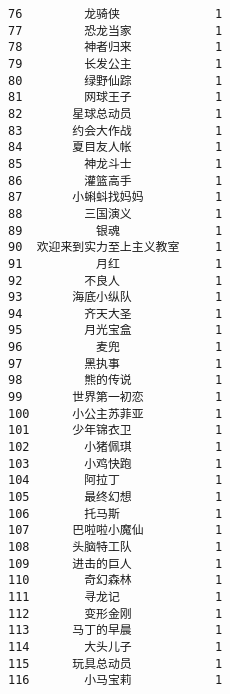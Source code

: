 \documentclass[11pt]{article}
\begin{document}
\begin{Verbatim}[commandchars=\\\{\}]
76 	　　　　龙骑侠　　　　　	 1 
77 	　　　　恐龙当家　　　　	 1 
78 	　　　　神者归来　　　　	 1 
79 	　　　　长发公主　　　　	 1 
80 	　　　　绿野仙踪　　　　	 1 
81 	　　　　网球王子　　　　	 1 
82 	　　　星球总动员　　　　	 1 
83 	　　　约会大作战　　　　	 1 
84 	　　　夏目友人帐　　　　	 1 
85 	　　　　神龙斗士　　　　	 1 
86 	　　　　灌篮高手　　　　	 1 
87 	　　　小蝌蚪找妈妈　　　	 1 
88 	　　　　三国演义　　　　	 1 
89 	　　　　　银魂　　　　　	 1 
90 	欢迎来到实力至上主义教室	 1 
91 	　　　　　月红　　　　　	 1 
92 	　　　　不良人　　　　　	 1 
93 	　　　海底小纵队　　　　	 1 
94 	　　　　齐天大圣　　　　	 1 
95 	　　　　月光宝盒　　　　	 1 
96 	　　　　　麦兜　　　　　	 1 
97 	　　　　黑执事　　　　　	 1 
98 	　　　　熊的传说　　　　	 1 
99 	　　　世界第一初恋　　　	 1 
100	　　　小公主苏菲亚　　　	 1 
101	　　　少年锦衣卫　　　　	 1 
102	　　　　小猪佩琪　　　　	 1 
103	　　　　小鸡快跑　　　　	 1 
104	　　　　阿拉丁　　　　　	 1 
105	　　　　最终幻想　　　　	 1 
106	　　　　托马斯　　　　　	 1 
107	　　　巴啦啦小魔仙　　　	 1 
108	　　　头脑特工队　　　　	 1 
109	　　　进击的巨人　　　　	 1 
110	　　　　奇幻森林　　　　	 1 
111	　　　　寻龙记　　　　　	 1 
112	　　　　变形金刚　　　　	 1 
113	　　　马丁的早晨　　　　	 1 
114	　　　　大头儿子　　　　	 1 
115	　　　玩具总动员　　　　	 1 
116	　　　　小马宝莉　　　　	 1 

    \end{Verbatim}
\end{document}
